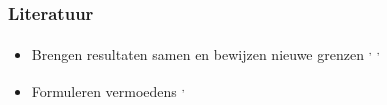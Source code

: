 \documentclass
[kulak] %
{kulakbeamer}
\begin{document}
	\begin{frame}
		\frametitle{Literatuur}
		
		
		
		\setcounter{footnote}{1} 
		
		\begin{itemize}
			\item Brengen resultaten samen en bewijzen nieuwe grenzen%
			\textsuperscript{\thefootnote,}%
			\textsuperscript{\thefootnote,}%
			\textsuperscript{\thefootnote} %
			
			\setcounter{footnote}{1} 
			\item Formuleren vermoedens%
			\textsuperscript{\thefootnote,}%
			\textsuperscript{\thefootnote} %
		\end{itemize}

		
		
	\end{frame}
	
\end{document}
